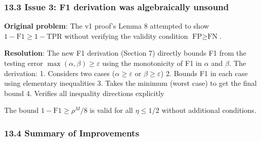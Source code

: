 \documentclass[
  12pt,
]{article}
\begin{document}
\subsubsection{13.3 Issue 3: F1 derivation was algebraically
unsound}\label{issue-3-f1-derivation-was-algebraically-unsound}

\textbf{Original problem}: The v1 proof's Lemma 8 attempted to show
\(1-\text{F1} \geq 1-\text{TPR}\) without verifying the validity
condition \(\text{FP} \geq \text{FN}\).

\textbf{Resolution}: The new F1 derivation (Section 7) directly bounds
F1 from the testing error \(\max(\alpha, \beta) \geq \varepsilon\) using
the monotonicity of F1 in \(\alpha\) and \(\beta\). The derivation: 1.
Considers two cases (\(\alpha \geq \varepsilon\) or
\(\beta \geq \varepsilon\)) 2. Bounds F1 in each case using elementary
inequalities 3. Takes the minimum (worst case) to get the final bound 4.
Verifies all inequality directions explicitly

The bound \(1-\text{F1} \geq \rho^M/8\) is valid for all
\(\eta \leq 1/2\) without additional conditions.

\subsubsection{13.4 Summary of
Improvements}\label{summary-of-improvements}
\end{document}
